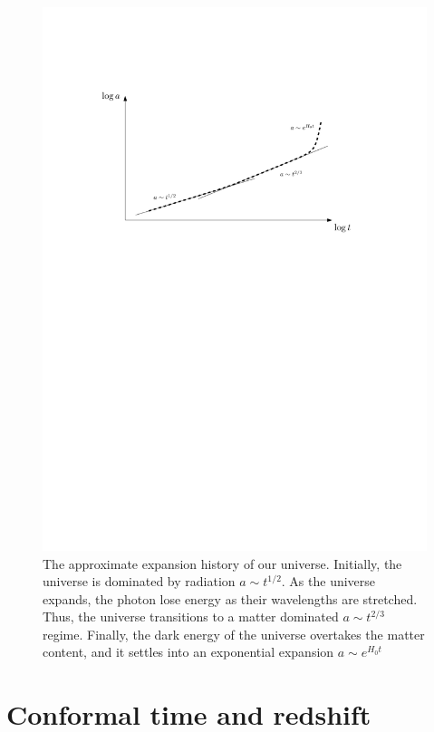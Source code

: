 \begin{figure}[tp]
  \centering
  \includegraphics[width=\textwidth]{chapters/inflationary_cosmology/figures/expansion_history}
  \caption{The approximate expansion history of our universe. Initially, the universe is dominated by radiation $a\sim t^{1/2}$. As the universe expands, the photon lose energy as their wavelengths are stretched.  Thus, the universe transitions to a matter dominated $a\sim t^{2/3}$ regime. Finally, the dark energy of the universe overtakes the matter content, and it settles into an exponential expansion $a\sim e^{H_0 t}$\label{fig:cos:expansion_history}}
\end{figure}


\section{Conformal time and redshift}
